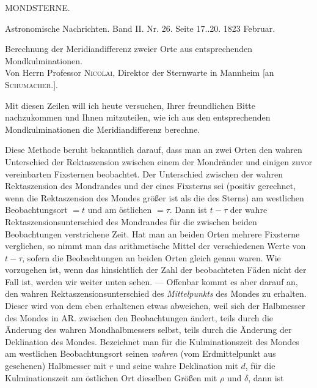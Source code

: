 \clearpage
{}
\hypertarget{native-448-mondsterne}{}
\begin{center}
{\large MONDSTERNE.}
\end{center}

\begin{center}
Astronomische Nachrichten. Band II. Nr. 26. Seite 17..20. 1823 Februar.
\end{center}

\begin{center}
Berechnung der Meridiandifferenz zweier Orte aus entsprechenden Mondkulminationen.\\
Von Herrn Professor \textsc{Nicolai}, Direktor der Sternwarte in Mannheim [an \textsc{Schumacher.}].
\end{center}

Mit diesen Zeilen will ich heute versuchen, Ihrer freundlichen Bitte nachzukommen und Ihnen mitzuteilen, wie ich aus den entsprechenden Mondkulminationen die Meridiandifferenz berechne.

Diese Methode beruht bekanntlich darauf, dass man an zwei Orten den wahren Unterschied der Rektaszension zwischen einem der Mondränder und einigen zuvor vereinbarten Fixsternen beobachtet. Der Unterschied zwischen der wahren Rektaszension des Mondrandes und der eines Fixsterns sei (positiv gerechnet, wenn die Rektaszension des Mondes größer ist als die des Sterns) am westlichen Beobachtungsort $=t$ und am östlichen $=\tau$. Dann ist $t-\tau$ der wahre Rektaszensionsunterschied des Mondrandes für die zwischen beiden Beobachtungen verstrichene Zeit. Hat man an beiden Orten mehrere Fixsterne verglichen, so nimmt man das arithmetische Mittel der verschiedenen Werte von $t-\tau$, sofern die Beobachtungen an beiden Orten gleich genau waren. Wie vorzugehen ist, wenn das hinsichtlich der Zahl der beobachteten Fäden nicht der Fall ist, werden wir weiter unten sehen. --- Offenbar kommt es aber darauf an, den wahren Rektaszensionsunterschied des \emph{Mittelpunkts} des Mondes zu erhalten. Dieser wird von dem eben erhaltenen etwas abweichen, weil sich der Halbmesser des Mondes in AR. zwischen den Beobachtungen ändert, teils durch die Änderung des wahren Mondhalbmessers selbst, teils durch die Änderung der Deklination des Mondes. Bezeichnet man für die Kulminationszeit des Mondes am westlichen Beobachtungsort seinen \emph{wahren} (vom Erdmittelpunkt aus gesehenen) Halbmesser mit $r$ und seine wahre Deklination mit $d$, für die Kulminationszeit am östlichen Ort dieselben Größen mit $\rho$ und $\delta$, dann ist

